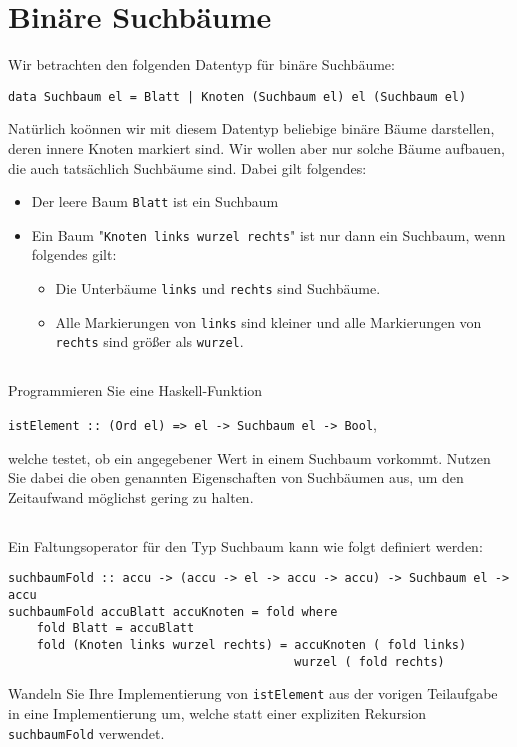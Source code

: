 \documentclass[
  10pt,                   %
  DIV12,
  german,                 %
  oneside,                %
  parskip=half,           %
  headings=normal,        %
  captions=tableheading,  %
]{scrartcl}
\begin{document}
\section{Binäre Suchbäume}
Wir betrachten den folgenden Datentyp für binäre Suchbäume:
\begin{center}
\lstinline!data Suchbaum el = Blatt | Knoten (Suchbaum el) el (Suchbaum el)!
\end{center}
Natürlich koönnen wir mit diesem Datentyp beliebige binäre Bäume darstellen, deren innere Knoten markiert sind. Wir wollen aber nur solche Bäume aufbauen, die auch tatsächlich Suchbäume sind. Dabei gilt folgendes:
\begin{itemize}
\item Der leere Baum \lstinline|Blatt| ist ein Suchbaum 
\item Ein Baum "\lstinline|Knoten links wurzel rechts|" ist nur dann ein Suchbaum, wenn folgendes gilt:
\begin{itemize}
\item Die Unterbäume \lstinline|links| und \lstinline|rechts| sind Suchbäume.
\item Alle Markierungen von \lstinline|links| sind kleiner und alle Markierungen von \lstinline|rechts| sind größer als \lstinline|wurzel|.
\end{itemize}
\end{itemize}
\subsection{}
Programmieren Sie eine Haskell-Funktion
\begin{center}
\lstinline|istElement :: (Ord el) => el -> Suchbaum el -> Bool|,
\end{center}
welche testet, ob ein angegebener Wert in einem Suchbaum vorkommt. Nutzen Sie dabei die oben genannten Eigenschaften von Suchbäumen aus, um den Zeitaufwand möglichst gering zu halten.

\subsection{}
Ein Faltungsoperator für den Typ Suchbaum kann wie folgt definiert werden: 
\begin{lstlisting}
suchbaumFold :: accu -> (accu -> el -> accu -> accu) -> Suchbaum el -> accu
suchbaumFold accuBlatt accuKnoten = fold where
    fold Blatt = accuBlatt
    fold (Knoten links wurzel rechts) = accuKnoten ( fold links)
                                        wurzel ( fold rechts)
\end{lstlisting}
Wandeln Sie Ihre Implementierung von \lstinline|istElement| aus der vorigen Teilaufgabe in eine Implementierung um, welche statt einer expliziten Rekursion \lstinline|suchbaumFold| verwendet.
\end{document}
